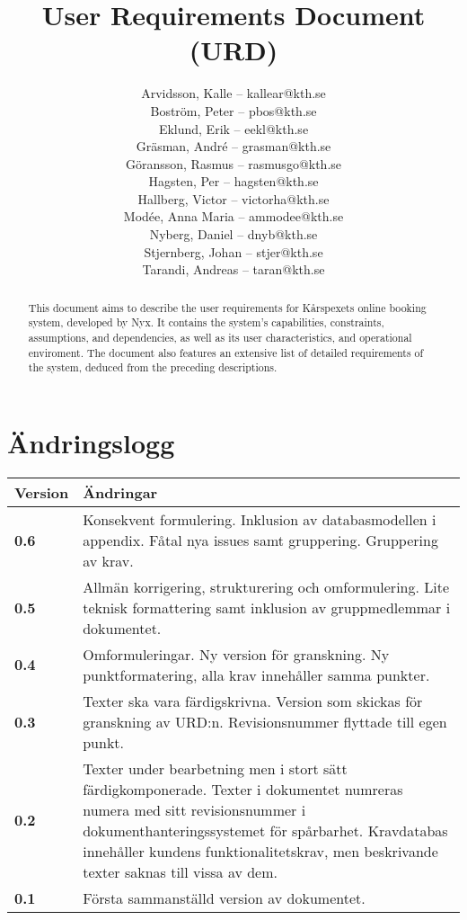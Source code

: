 \documentclass[a4paper, twoside, 11pt, titlepage]{article}
\author{
	\small
	Arvidsson, Kalle -- kallear@kth.se\\
	Boström, Peter -- pbos@kth.se\\
	Eklund, Erik -- eekl@kth.se\\
	Gräsman, André -- grasman@kth.se\\
	Göransson, Rasmus -- rasmusgo@kth.se\\
	Hagsten, Per -- hagsten@kth.se\\
	Hallberg, Victor -- victorha@kth.se\\
	Modée, Anna Maria -- ammodee@kth.se\\
	Nyberg, Daniel -- dnyb@kth.se\\
	Stjernberg, Johan -- stjer@kth.se\\
	Tarandi, Andreas -- taran@kth.se
	}
\title{User Requirements Document (URD)}
\begin{document}
\maketitle

\clearpage
\thispagestyle{empty}
\mbox{}
\newpage

\begin{abstract}
	This document aims to describe the user requirements for Kårspexets online booking system, developed by Nyx. It contains the system's capabilities, constraints, assumptions, and dependencies, as well as its user characteristics, and operational enviroment. The document also features an extensive list of detailed requirements of the system, deduced from the preceding descriptions.
\end{abstract}

\newpage

\tableofcontents

\clearpage
\setcounter{page}{1}

\startfooter

\clearpage
\section*{Ändringslogg}


\begin{tabular} { p{2.6cm} p{12.5cm} }
	\hline
	\sffamily\textbf{Version} & \sffamily\textbf{Ändringar } \\
	\hline
	\sffamily\textbf{0.6} & Konsekvent formulering. Inklusion av databasmodellen i appendix. Fåtal nya issues samt gruppering. Gruppering av krav.  \\
	\hline
	\sffamily\textbf{0.5} & Allmän korrigering, strukturering och omformulering. Lite teknisk formattering samt inklusion av gruppmedlemmar i dokumentet.  \\
	\hline
	\sffamily\textbf{0.4} & Omformuleringar. Ny version för granskning. Ny punktformatering, alla krav innehåller samma punkter.  \\
	\hline
	\sffamily\textbf{0.3} & Texter ska vara färdigskrivna. Version som skickas för granskning av URD:n. Revisionsnummer flyttade till egen punkt.  \\
	\hline
	\sffamily\textbf{0.2} & Texter under bearbetning men i stort sätt färdigkomponerade. Texter i dokumentet numreras numera med sitt revisionsnummer i dokumenthanteringssystemet för spårbarhet. Kravdatabas innehåller kundens funktionalitetskrav, men beskrivande texter saknas till vissa av dem.  \\
	\hline
	\sffamily\textbf{0.1} & Första sammanställd version av dokumentet.  \\
	\hline
\end{tabular}
\end{document}
